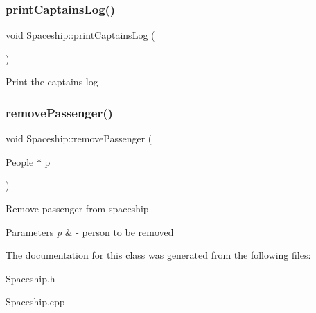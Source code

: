 \subsubsection{\texorpdfstring{print\+Captains\+Log()}{printCaptainsLog()}}
{\footnotesize\ttfamily void Spaceship\+::print\+Captains\+Log (\begin{DoxyParamCaption}{ }\end{DoxyParamCaption})}

Print the captains log \mbox{\label{classSpaceship_ac816c2990b25a1b7c9f6acbc9ca132ee}} 
\subsubsection{\texorpdfstring{remove\+Passenger()}{removePassenger()}}
{\footnotesize\ttfamily void Spaceship\+::remove\+Passenger (\begin{DoxyParamCaption}\item[{\hyperlink{classPeople}{People} $\ast$}]{p }\end{DoxyParamCaption})\hspace{0.3cm}{\ttfamily [virtual]}}

Remove passenger from spaceship 
\begin{DoxyParams}{Parameters}
{\em p} & -\/ person to be removed \\
\hline
\end{DoxyParams}


The documentation for this class was generated from the following files\+:\begin{DoxyCompactItemize}
\item 
Spaceship.\+h\item 
Spaceship.\+cpp\end{DoxyCompactItemize}
